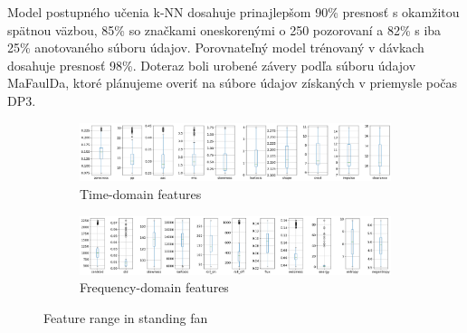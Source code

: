 Model postupného učenia k-NN dosahuje prinajlepšom 90\% presnosť s okamžitou spätnou väzbou, 85\% so značkami oneskorenými o 250 pozorovaní a 82\% s iba 25\% anotovaného súboru údajov. Porovnateľný model trénovaný v dávkach dosahuje presnosť 98\%.  Doteraz boli urobené závery podľa súboru údajov MaFaulDa, ktoré plánujeme overiť na súbore údajov získaných v priemysle počas DP3.

\begin{figure}[h]
    \centering
    \begin{subfigure}[b]{0.48\textwidth}
        \includegraphics[width=\textwidth]{assets/results/feature-values/fan-TD-features.png}
        \caption{Time-domain features}
    \end{subfigure}
    \hfill
    \begin{subfigure}[b]{0.48\textwidth}
        \includegraphics[width=\textwidth]{assets/results/feature-values/fan-FD-features.png}
        \caption{Frequency-domain features}
    \end{subfigure}
    \caption{Feature range in standing fan}
\end{figure}
